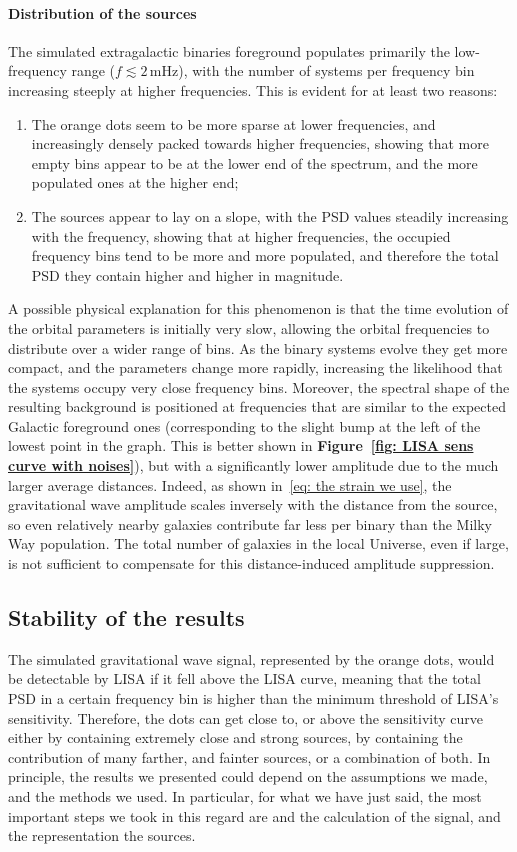 \paragraph{Distribution of the sources}
The simulated extragalactic binaries foreground populates primarily the low-frequency range ($f \lesssim 2\,\mathrm{mHz}$), with the number of systems per frequency bin increasing steeply at higher frequencies. 
This is evident for at least two reasons:
\begin{enumerate}
    \item The orange dots seem to be more sparse at lower frequencies, and increasingly densely packed towards higher frequencies, showing that more empty bins appear to be at the lower end of the spectrum, and the more populated ones at the higher end;
    \item The sources appear to lay on a slope, with the PSD values steadily increasing with the frequency, showing that at higher frequencies, the occupied frequency bins tend to be more and more populated, and therefore the total PSD they contain higher and higher in magnitude.
\end{enumerate}
A possible physical explanation for this phenomenon is that the time evolution of the orbital parameters is initially very slow, allowing the orbital frequencies to distribute over a wider range of bins.
As the binary systems evolve they get more compact, and the parameters change more rapidly, increasing the likelihood that the systems occupy very close frequency bins.
Moreover, the spectral shape of the resulting background is positioned at frequencies that are similar to the expected Galactic foreground ones (corresponding to the slight bump at the left of the lowest point in the graph. 
This is better shown in \textbf{Figure~\ref{fig: LISA sens curve with noises}}), but with a significantly lower amplitude due to the much larger average distances.
Indeed, as shown in~\eqref{eq: the strain we use}, the gravitational wave amplitude scales inversely with the distance from the source, so even relatively nearby galaxies contribute far less per binary than the Milky Way population. 
The total number of galaxies in the local Universe, even if large, is not sufficient to compensate for this distance-induced amplitude suppression.


\subsection{Stability of the results}
The simulated gravitational wave signal, represented by the orange dots, would be detectable by LISA if it fell above the LISA curve, meaning that the total PSD in a certain frequency bin is higher than the minimum threshold of LISA's sensitivity.
Therefore, the dots can get close to, or above the sensitivity curve either by containing extremely close and strong sources, by containing the contribution of many farther, and fainter sources, or a combination of both.
In principle, the results we presented could depend on the assumptions we made, and the methods we used.
In particular, for what we have just said, the most important steps we took in this regard are and the calculation of the signal, and the representation the sources.

